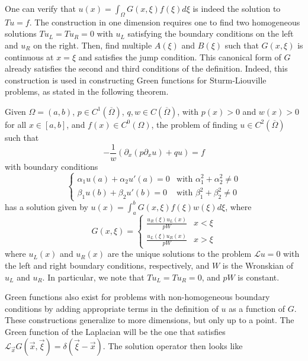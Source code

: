 One can verify that $u(x)=\int_{\Omega}G(x,\xi)f(\xi)d\xi$ is indeed the solution to $Tu=f$. The construction in one dimension requires one to find two homogeneous solutions $Tu_L = Tu_R = 0$ with $u_L$ satisfying the boundary conditions on the left and $u_R$ on the right. Then, find multiple $A(\xi)$ and $B(\xi)$ such that $G(x,\xi)$ is continuous at $x=\xi$ and satisfies the jump condition. This canonical form of $G$ already satisfies the second and third conditions of the definition. Indeed, this construction is used in constructing Green functions for Sturm-Liouville problems, as stated in the following theorem. 
\begin{theorem}
Given $\Omega=(a,b)$, $p\in C^{1}(\overline{\Omega})$, $q, w \in C(\overline{\Omega})$, with $p(x)>0$ and $w(x)>0$ for all $x\in[a,b]$, and $f(x)\in C^{0}(\Omega)$, the problem of finding $u\in C^{2}(\overline{\Omega})$ such that 
\begin{equation*}
    -\frac{1}{w}(\partial_{x}(p\partial_{x}u)+qu)=f
\end{equation*}
with boundary conditions
\begin{equation*}
    \begin{cases}\alpha_{1}u(a)+\alpha_{2}u'(a)=0 & \text{with } \alpha_{1}^{2}+\alpha_{2}^{2}\ne0\\ \beta_{1}u(b)+\beta_{2}u'(b)=0 & \text{with } \beta_{1}^{2}+\beta_{2}^{2}\ne0\end{cases}
\end{equation*}
has a solution given by $u(x)=\int_{a}^{b}G(x,\xi)f(\xi)w(\xi)d\xi$, where
\begin{equation*}
    G(x,\xi)=\begin{cases} \frac{u_R(\xi)u_L(x)}{pW} & x < \xi \\ \frac{u_L(\xi)u_R(x)}{pW} & x > \xi \end{cases}
\end{equation*}
where $u_L(x)$ and $u_R(x)$ are the unique solutions to the problem $\mathcal{L}u=0$ with the left and right boundary conditions, respectively, and $W$ is the Wronskian of $u_L$ and $u_R$. In particular, we note that $Tu_L = Tu_R = 0$, and $pW$ is constant. 
\end{theorem}
Green functions also exist for problems with non-homogeneous boundary conditions by adding appropriate terms in the definition of $u$ as a function of $G$. These constructions generalize to more dimensions, but only up to a point. The Green function of the Laplacian will be the one that satisfies $\mathcal{L}_{\vec{x}}G(\vec{x},\vec{\xi})=\delta(\vec{\xi}-\vec{x})$. The solution operator then looks like

